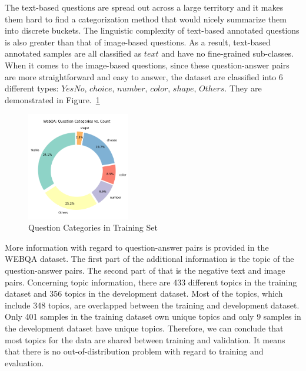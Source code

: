 \documentclass[nohyperref]{article}
\theoremstyle{plain}
\theoremstyle{definition}
\theoremstyle{remark}
\begin{document}
    The text-based questions are spread out across a large territory and it makes them hard to find a categorization method that would nicely summarize them into discrete buckets. The linguistic complexity of text-based annotated questions is also greater than that of image-based questions. As a result, text-based annotated samples are all classified as $\mathit{text}$ and have no fine-grained sub-classes. When it comes to the image-based questions, since these question-answer pairs are more straightforward and easy to answer, the dataset are classified into 6 different types: $\mathit{YesNo}$, $\mathit{choice}$, $\mathit{number}$, $\mathit{color}$, $\mathit{shape}$, $\mathit{Others}$. They are demonstrated in Figure.~\ref{fig:qcate_pie}

    \begin{figure}[h]
        \center
        \includegraphics[width=0.4\textwidth]{img/textQCat2count.png}
        \caption{Question Categories in Training Set}
        \label{fig:qcate_pie}
    \end{figure}

    More information with regard to question-answer pairs is provided in the WEBQA dataset. The first part of the additional information is the topic of the question-answer pairs. The second part of that is the negative text and image pairs. Concerning topic information, there are 433 different topics in the training dataset and 356 topics in the development dataset. Most of the topics, which include 348 topics, are overlapped between the training and development dataset. Only 401 samples in the training dataset own unique topics and only 9 samples in the development dataset have unique topics. Therefore, we can conclude that most topics for the data are shared between training and validation. It means that there is no out-of-distribution problem with regard to training and evaluation.
\end{document}

